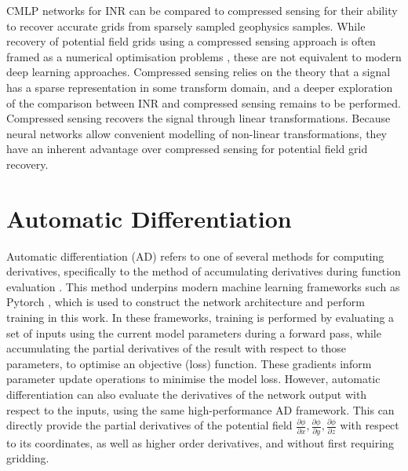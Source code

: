 \documentclass[manuscript.tex]{subfiles}
\begin{document}
CMLP networks for INR can be compared to compressed sensing \parencite{candesIntroductionCompressiveSampling2008} for their ability to recover accurate grids from sparsely sampled geophysics samples.
While recovery of potential field grids using a compressed sensing approach is often framed as a numerical optimisation problems \parencite[e.g.][]{yangAirborneGravimetryData2015,xuGravityAnomalyReconstruction2019}, these are not equivalent to modern deep learning approaches.
Compressed sensing relies on the theory that a signal has a sparse representation in some transform domain, and a deeper exploration of the comparison between INR and compressed sensing remains to be performed.
Compressed sensing recovers the signal through linear transformations.
Because neural networks allow convenient modelling of non-linear transformations, they have an inherent advantage over compressed sensing for potential field grid recovery.

\section{Automatic Differentiation}
Automatic differentiation (AD) refers to one of several methods for computing derivatives, specifically to the method of accumulating derivatives during function evaluation \parencite{baydinAutomaticDifferentiationMachine2018}.
This method underpins modern machine learning frameworks such as Pytorch \parencite{paszkePyTorchImperativeStyle2019}, which is used to construct the network architecture and perform training in this work.
In these frameworks, training is performed by evaluating a set of inputs using the current model parameters during a forward pass, while accumulating the partial derivatives of the result with respect to those parameters, to optimise an objective (loss) function.
These gradients inform parameter update operations to minimise the model loss.
However, automatic differentiation can also evaluate the derivatives of the network output with respect to the inputs, using the same high-performance AD framework.
This can directly provide the partial derivatives of the potential field \(\frac{\partial\phi{}}{\partial x}, \frac{\partial \phi{}}{\partial y}, \frac{\partial \phi{}}{\partial z}\) with respect to its coordinates, as well as higher order derivatives, and without first requiring gridding.

\end{document}
